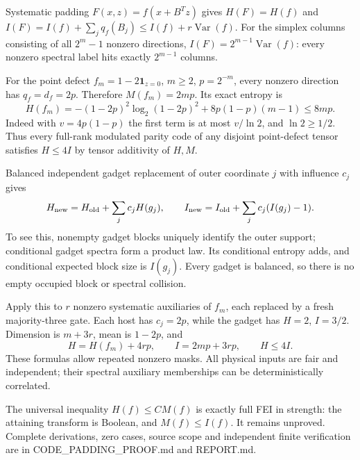 \documentclass{article}
\begin{document}
Systematic padding $F(x,z)=f(x+B^Tz)$ gives
$H(F)=H(f)$ and $I(F)=I(f)+\sum_jq_f(B_j)\le I(f)+r\operatorname{Var}(f)$.
For the simplex columns consisting of all $2^m-1$ nonzero directions,
$I(F)=2^{m-1}\operatorname{Var}(f)$: every nonzero spectral label hits exactly $2^{m-1}$ columns.

For the point defect $f_m=1-2\mathbf1_{z=0}$, $m\ge2$, $p=2^{-m}$, every nonzero direction has $q_f=d_f=2p$. Therefore $M(f_m)=2mp$. Its exact entropy is
\[
H(f_m)=-(1-2p)^2\log_2(1-2p)^2+8p(1-p)(m-1)\le8mp.
\]
Indeed with $v=4p(1-p)$ the first term is at most $v/\ln2$, and $\ln2\ge1/2$. Thus every full-rank modulated parity code of any disjoint point-defect tensor satisfies $H\le4I$ by tensor additivity of $H,M$.

Balanced independent gadget replacement of outer coordinate $j$ with influence $c_j$ gives
\[
H_{\rm new}=H_{\rm old}+\sum_jc_jH(g_j),\qquad
I_{\rm new}=I_{\rm old}+\sum_jc_j(I(g_j)-1).
\]
To see this, nonempty gadget blocks uniquely identify the outer support; conditional gadget spectra form a product law. Its conditional entropy adds, and conditional expected block size is $I(g_j)$. Every gadget is balanced, so there is no empty occupied block or spectral collision.

Apply this to $r$ nonzero systematic auxiliaries of $f_m$, each replaced by a fresh majority-three gate. Each host has $c_j=2p$, while the gadget has $H=2$, $I=3/2$. Dimension is $m+3r$, mean is $1-2p$, and
\[
H=H(f_m)+4rp,\qquad I=2mp+3rp,\qquad H\le4I.
\]
These formulas allow repeated nonzero masks. All physical inputs are fair and independent; their spectral auxiliary memberships can be deterministically correlated.

The universal inequality $H(f)\le C M(f)$ is exactly full FEI in strength: the attaining transform is Boolean, and $M(f)\le I(f)$. It remains unproved. Complete derivations, zero cases, source scope and independent finite verification are in CODE\_PADDING\_PROOF.md and REPORT.md.
\end{document}
